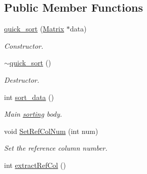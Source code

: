 \subsection*{Public Member Functions}
\begin{DoxyCompactItemize}
\item 
\hypertarget{classquick__sort_ae57ce43aa565d3b19fcb3eced616f752}{
\hyperlink{classquick__sort_ae57ce43aa565d3b19fcb3eced616f752}{quick\_\-sort} (\hyperlink{classMatrix}{Matrix} $\ast$data)}
\label{db/df3/classquick__sort_ae57ce43aa565d3b19fcb3eced616f752}

\begin{DoxyCompactList}\small\item\em Constructor. \item\end{DoxyCompactList}\item 
\hypertarget{classquick__sort_ae128be96510fbf4580ea2a69da8cb31c}{
\hyperlink{classquick__sort_ae128be96510fbf4580ea2a69da8cb31c}{$\sim$quick\_\-sort} ()}
\label{db/df3/classquick__sort_ae128be96510fbf4580ea2a69da8cb31c}

\begin{DoxyCompactList}\small\item\em Destructor. \item\end{DoxyCompactList}\item 
\hypertarget{classquick__sort_ab20c3d0fcf9416210794862c7e547064}{
int \hyperlink{classquick__sort_ab20c3d0fcf9416210794862c7e547064}{sort\_\-data} ()}
\label{db/df3/classquick__sort_ab20c3d0fcf9416210794862c7e547064}

\begin{DoxyCompactList}\small\item\em Main \hyperlink{classsorting}{sorting} body. \item\end{DoxyCompactList}\item 
\hypertarget{classquick__sort_ac0e55f4139666cd618a22d5ca27a59ee}{
void \hyperlink{classquick__sort_ac0e55f4139666cd618a22d5ca27a59ee}{SetRefColNum} (int num)}
\label{db/df3/classquick__sort_ac0e55f4139666cd618a22d5ca27a59ee}

\begin{DoxyCompactList}\small\item\em Set the reference column number. \item\end{DoxyCompactList}\item 
\hypertarget{classquick__sort_acf75fde0f0878e27c70bb78cd72e420c}{
int \hyperlink{classquick__sort_acf75fde0f0878e27c70bb78cd72e420c}{extractRefCol} ()}
\label{db/df3/classquick__sort_acf75fde0f0878e27c70bb78cd72e420c}


\end{DoxyCompactItemize}
